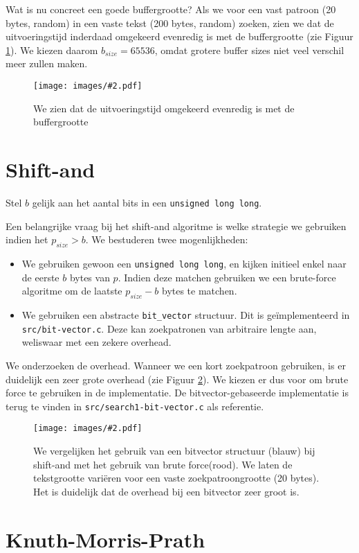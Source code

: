 \documentclass[a4paper,11pt]{article}
\newcommand{\image}[3][1]{
    \begin{figure}
    \begin{center}
    \texttt{[image: images/\#2.pdf]}
    \caption{#3}
    \label{fig:#2}
    \end{center}
    \end{figure}
}
\begin{document}
Wat is nu concreet een goede buffergrootte? Als we voor een vast patroon (20
bytes, random) in een vaste tekst (200 bytes, random) zoeken, zien we dat de
uitvoeringstijd inderdaad omgekeerd evenredig is met de buffergrootte (zie
Figuur \ref{fig:plot-buffer-size}). We kiezen daarom $b_{size} = 65536$, omdat
grotere buffer sizes niet veel verschil meer zullen maken.

\image{plot-buffer-size}{We zien dat de uitvoeringstijd omgekeerd evenredig is
met de buffergrootte}

\section{Shift-and}

Stel $b$ gelijk aan het aantal bits in een \verb#unsigned long long#.

Een belangrijke vraag bij het shift-and algoritme is welke strategie we
gebruiken indien het $p_{size} > b$. We bestuderen twee mogenlijkheden:

\begin{itemize}
    \item We gebruiken gewoon een \verb#unsigned long long#, en kijken initieel
    enkel naar de eerste $b$ bytes van $p$. Indien deze matchen gebruiken we een
    brute-force algoritme om de laatste $p_{size} - b$ bytes te matchen.
    \item We gebruiken een abstracte \verb$bit_vector$ structuur. Dit is
    ge\"implementeerd in \verb#src/bit-vector.c#. Deze kan zoekpatronen van
    arbitraire lengte aan, weliswaar met een zekere overhead.
\end{itemize}

We onderzoeken de overhead. Wanneer we een kort zoekpatroon gebruiken, is er
duidelijk een zeer grote overhead (zie Figuur \ref{fig:plot-bit-vector}).
We kiezen er dus voor om brute force te gebruiken in de implementatie.
De bitvector-gebaseerde implementatie is terug te vinden in
\verb#src/search1-bit-vector.c# als referentie.

\image{plot-bit-vector}{We vergelijken het gebruik van een bitvector structuur
(blauw) bij shift-and met het gebruik van brute force(rood). We laten de
tekstgrootte vari\"eren voor een vaste zoekpatroongrootte (20 bytes). Het is
duidelijk dat de overhead bij een bitvector zeer groot is.}

\section{Knuth-Morris-Prath}
\end{document}
